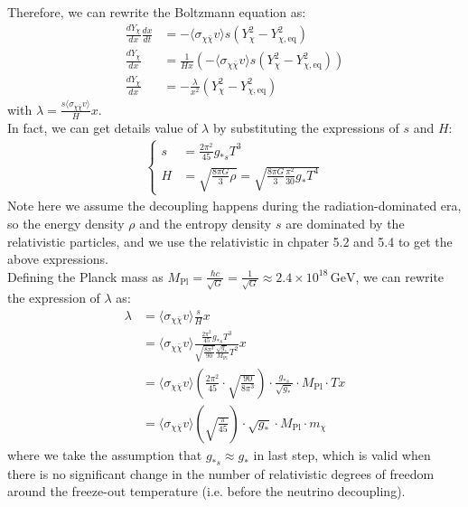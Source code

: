 \begin{foundation}
    Therefore, we can rewrite the Boltzmann equation as:
    \begin{align*}
        \frac{dY_\chi}{dx} \frac{dx}{dt} &= - \langle \sigma_{\chi \bar{\chi}} v \rangle s (Y_\chi^2 - Y_{\chi,\mathrm{eq}}^2) \\
        \frac{dY_\chi}{dx}  &= \frac{1}{H x} \left( - \langle \sigma_{\chi \bar{\chi}} v \rangle s (Y_\chi^2 - Y_{\chi,\mathrm{eq}}^2) \right) \\
        \frac{dY_\chi}{dx} &= - \frac{\lambda}{x^2} (Y_\chi^2 - Y_{\chi,\mathrm{eq}}^2)
    \end{align*}
    with $\lambda = \frac{s \langle \sigma_{\chi \bar{\chi}} v \rangle}{H} x$. \\

    In fact, we can get details value of $\lambda$ by substituting the expressions of $s$ and $H$:
    \begin{align*}
        \begin{cases}
        s &= \frac{2\pi^2}{45} g_{*s} T^3 \\
        H &= \sqrt{\frac{8\pi G}{3} \rho} = \sqrt{\frac{8\pi G}{3} \frac{\pi^2}{30} g_* T^4}
        \end{cases}
    \end{align*}
    Note here we assume the decoupling happens during the radiation-dominated era, so the energy density $\rho$ and the entropy density $s$ are dominated by the relativistic particles, and we use the relativistic in chpater 5.2 and 5.4 to get the above expressions. \\

    Defining the Planck mass as $M_{\mathrm{Pl}} = \frac{\hbar c}{\sqrt{G}} = \frac{1}{\sqrt{G}} \approx 2.4 \times 10^{18} \, \mathrm{GeV}$, we can rewrite the expression of $\lambda$ as:
    \begin{align*}
        \lambda &= \langle \sigma_{\chi \bar{\chi}} v \rangle \frac{s}{H} x \\
        &= \langle \sigma_{\chi \bar{\chi}} v \rangle \frac{\frac{2\pi^2}{45} g_{*s} T^3}{\sqrt{\frac{8 \pi^3}{90}} \frac{\sqrt{g_*}}{M_{\mathrm{Pl}}} T^2} x \\
        &= \langle \sigma_{\chi \bar{\chi}} v \rangle \left( \frac{2\pi^2}{45} \cdot \sqrt{\frac{90}{8 \pi^3}} \right) \cdot \frac{g_{*s}}{\sqrt{g_*}} \cdot M_{\mathrm{Pl}} \cdot T x\\
        &= \langle \sigma_{\chi \bar{\chi}} v \rangle \left( \sqrt{\frac{\pi}{45}} \right) \cdot \sqrt{g_{*}} \cdot M_{\mathrm{Pl}} \cdot m_\chi
    \end{align*}
    where we take the assumption that $g_{*s} \approx g_*$ in last step, which is valid when there is no significant change in the number of relativistic degrees of freedom around the freeze-out temperature (i.e. before the neutrino decoupling). \\
\end{foundation}

